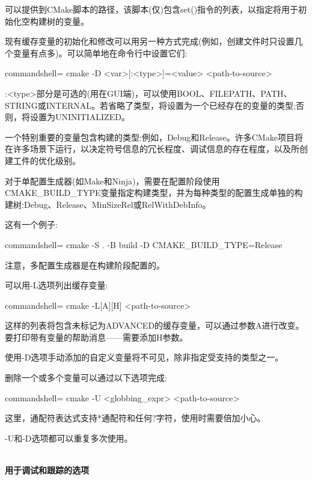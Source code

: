 可以提供到CMake脚本的路径，该脚本(仅)包含set()指令的列表，以指定将用于初始化空构建树的变量。

现有缓存变量的初始化和修改可以用另一种方式完成(例如，创建文件时只设置几个变量有点多)。可以简单地在命令行中设置它们:

\begin{tcblisting}{commandshell={}}
cmake -D <var>[:<type>]=<value> <path-to-source>
\end{tcblisting}

:<type>部分是可选的(用在GUI端)，可以使用BOOL、FILEPATH、PATH、STRING或INTERNAL。若省略了类型，将设置为一个已经存在的变量的类型;否则，将设置为UNINITIALIZED。

一个特别重要的变量包含构建的类型:例如，Debug和Release。许多CMake项目将在许多场景下运行，以决定符号信息的冗长程度、调试信息的存在程度，以及所创建工件的优化级别。

对于单配置生成器(如Make和Ninja)，需要在配置阶段使用CMAKE\_BUILD\_TYPE变量指定构建类型，并为每种类型的配置生成单独的构建树:Debug、Release、MinSizeRel或RelWithDebInfo。

这有一个例子:

\begin{tcblisting}{commandshell={}}
cmake -S . -B build -D CMAKE_BUILD_TYPE=Release
\end{tcblisting}

注意，多配置生成器是在构建阶段配置的。

可以用-L选项列出缓存变量:

\begin{tcblisting}{commandshell={}}
cmake -L[A][H] <path-to-source>
\end{tcblisting}

这样的列表将包含未标记为ADVANCED的缓存变量，可以通过参数A进行改变。要打印带有变量的帮助消息——需要添加H参数。

使用-D选项手动添加的自定义变量将不可见，除非指定受支持的类型之一。

删除一个或多个变量可以通过以下选项完成:

\begin{tcblisting}{commandshell={}}
cmake -U <globbing_expr> <path-to-source>
\end{tcblisting}

这里，通配符表达式支持*通配符和任何?字符，使用时需要倍加小心。

-U和-D选项都可以重复多次使用。

\hspace*{\fill} \\ %
\noindent
\textbf{用于调试和跟踪的选项}

